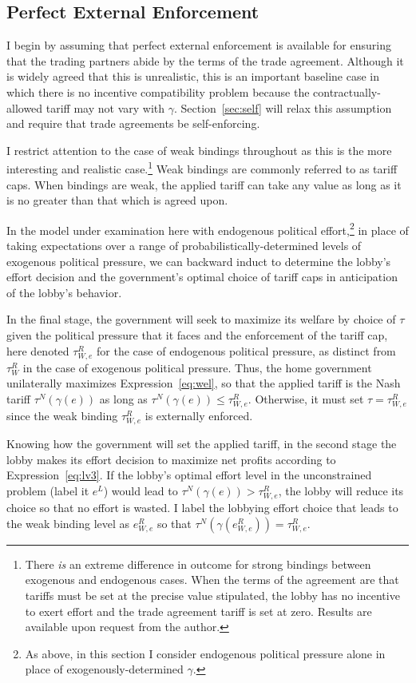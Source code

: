 \documentclass[12pt]{article}
\newcommand{\ga}{\gamma}
\begin{document}
\subsection{Perfect External Enforcement}
\label{sec:perfect}
I begin by assuming that perfect external enforcement is available for ensuring that the trading partners abide by the terms of the trade agreement. Although it is widely agreed that this is unrealistic, this is an important baseline case in which there is no incentive compatibility problem because the contractually-allowed tariff may not vary with $\ga$. Section~\ref{sec:self} will relax this assumption and require that trade agreements be self-enforcing.

I restrict attention to the case of weak bindings throughout as this is the more interesting and realistic case.\footnote{There \textit{is} an extreme difference in outcome for strong bindings between exogenous and endogenous cases. When the terms of the agreement are that tariffs must be set at the precise value stipulated, the lobby has no incentive to exert effort and the trade agreement tariff is set at zero. Results are available upon request from the author.} Weak bindings are commonly referred to as tariff caps. When bindings are weak, the applied tariff can take any value as long as it is no greater than that which is agreed upon.

In the model under examination here with endogenous political effort,\footnote{As above, in this section I consider endogenous political pressure alone in place of exogenously-determined $\ga$.} in place of taking expectations over a range of probabilistically-determined levels of exogenous political pressure, we can backward induct to determine the lobby's effort decision and the government's optimal choice of tariff caps in anticipation of the lobby's behavior.

In the final stage, the government will seek to maximize its welfare by choice of $\tau$ given the political pressure that it faces and the enforcement of the tariff cap, here denoted $\tau_{W,e}^R$ for the case of endogenous political pressure, as distinct from $\tau_W^R$ in the case of exogenous political pressure. Thus, the home government unilaterally maximizes Expression~\ref{eq:wel}, so that the applied tariff is the Nash tariff $\tau^N(\ga(e))$ as long as  $\tau^N(\ga(e)) \leq \tau_{W,e}^R$. Otherwise, it must set $\tau = \tau_{W,e}^R$ since the weak binding $\tau_{W,e}^R$ is externally enforced.

Knowing how the government will set the applied tariff, in the second stage the lobby makes its effort decision to maximize net profits according to Expression~\ref{eq:lv3}. If the lobby's optimal effort level in the unconstrained problem (label it $e^L$) would lead to $\tau^N(\ga(e)) > \tau_{W,e}^R$, the lobby will reduce its choice so that no effort is wasted. I label the lobbying effort choice that leads to the weak binding level as $e^R_{W,e}$ so that $\tau^N(\ga(e^R_{W,e})) = \tau_{W,e}^R$.
\end{document}
